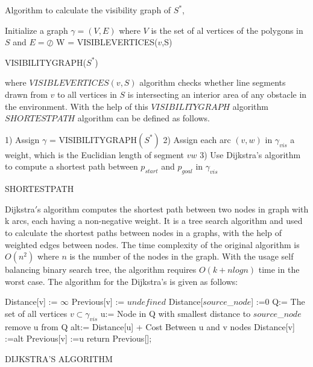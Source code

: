 Algorithm to calculate the visibility graph of $S^*$,
	
\begin{algorithm}[H]
Initialize a graph $\gamma = (V,E)$ where $V$ is the set of al vertices of the polygons in $S$ and $E = \oslash$ 
{		
W = VISIBLEVERTICES($v$,S)\;}
\caption{VISIBILITYGRAPH($S^*$)}
\end{algorithm}

where $VISIBLEVERTICES(v,S)$ algorithm checks whether line segments drawn from $v$ to all vertices in $S$ is intersecting an interior area of any obstacle in the environment. With the help of this $VISIBILITYGRAPH$ algorithm $SHORTESTPATH$ algorithm can be defined as follows.
	
\begin{algorithm}[H]
1) Assign $\gamma$ = VISIBILITYGRAPH$(S^*)$
2) Assign each arc $(v,w)$ in $\gamma_{vis}$ a weight, which is the Euclidian length of segment $vw$
3) Use Dijkstra's algorithm to compute a shortest path between $p_{start}$ and $p_{goal}$ in $\gamma_{vis}$
\caption{SHORTESTPATH}
\end{algorithm}
	
Dijkstra$'$s algorithm computes the shortest path between two nodes in
graph with k arcs, each having a non-negative weight. It is a tree search algorithm and  used to calculate the shortest paths between nodes in a graphs, with the help of weighted edges between nodes. The time complexity of the original algorithm is $O(n^2)$ where $n$ is the number of the nodes in the graph. With the usage self balancing binary search tree, the algorithm requires $O(k+nlogn)$ time in the worst case. The algorithm for the Dijkstra's is given as follows:
	
\begin{algorithm}[H]
{		
Distance[v] := $\infty$ \;
Previous[v] := $undefined$ \;
}
Distance[$source$\_$ node$] :=0  \;
Q:= The set of all vertices $v \subset \gamma_{vis}$ \;
{
u:= Node in Q with smallest distance to $source$\_$ node$\;
remove u from Q\;
{
alt:= Distance[u] + Cost Between u and v nodes\;
{
Distance[v] :=alt\;
Previous[v] :=u\;
}
}
}
return Previous[];
\caption{DIJKSTRA'S ALGORITHM}
\end{algorithm}

